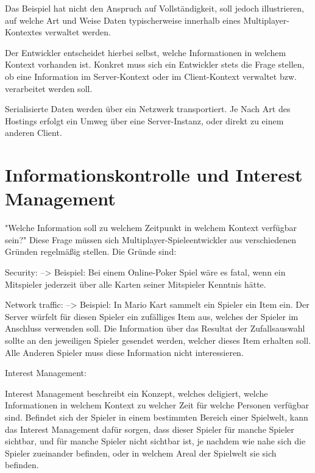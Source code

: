 Das Beispiel hat nicht den Anspruch auf Vollständigkeit, soll jedoch illustrieren, auf welche Art und Weise Daten typischerweise innerhalb eines Multiplayer-Kontextes verwaltet werden.

Der Entwickler entscheidet hierbei selbst, welche Informationen in welchem Kontext vorhanden ist. Konkret muss sich ein Entwickler stets die Frage stellen, ob eine Information im Server-Kontext oder im Client-Kontext verwaltet bzw. verarbeitet werden soll.

Serialisierte Daten werden über ein Netzwerk transportiert. Je Nach Art des Hostings erfolgt ein Umweg über eine Server-Instanz, oder direkt zu einem anderen Client. \cite{Smed.2002c}

\section{Informationskontrolle und Interest Management}


"Welche Information soll zu welchem Zeitpunkt in welchem Kontext verfügbar sein?" Diese Frage müssen sich Multiplayer-Spieleentwickler aus verschiedenen Gründen regelmäßig stellen.
Die Gründe sind:

Security:
--> Beispiel: Bei einem Online-Poker Spiel wäre es fatal, wenn ein Mitspieler jederzeit über alle Karten seiner Mitspieler Kenntnis hätte. 

Network traffic:
--> Beispiel: In Mario Kart sammelt ein Spieler ein Item ein. Der Server würfelt für diesen Spieler ein zufälliges Item aus, welches der Spieler im Anschluss verwenden soll. Die Information über das Resultat der Zufallsauswahl sollte an den jeweiligen Spieler gesendet werden, welcher dieses Item erhalten soll. Alle Anderen Spieler muss diese Information nicht interessieren. 

Interest Management:

Interest Management beschreibt ein Konzept, welches deligiert, welche Informationen in welchem Kontext zu welcher Zeit für welche Personen verfügbar sind. Befindet sich der Spieler in einem bestimmten Bereich einer Spielwelt, kann das Interest Management dafür sorgen, dass dieser Spieler für manche Spieler sichtbar, und für manche Spieler nicht sichtbar ist, je nachdem wie nahe sich die Spieler zueinander befinden, oder in welchem Areal der Spielwelt sie sich befinden.

